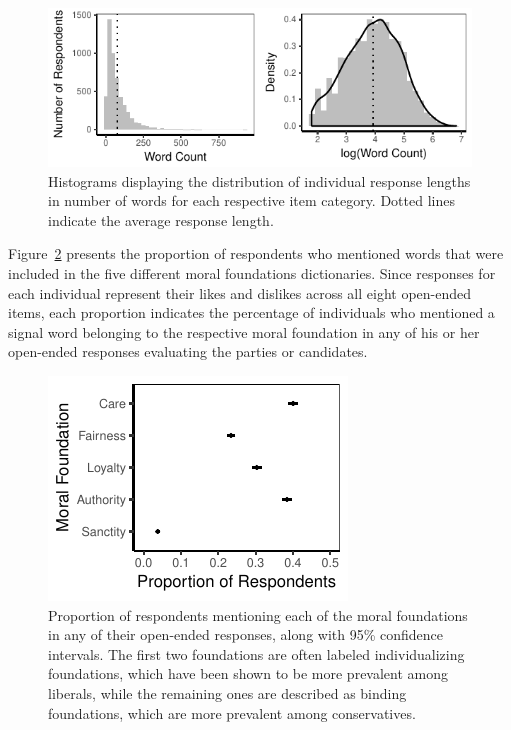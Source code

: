 \documentclass[12pt]{article}
\begin{document}
\begin{figure}[h]\centering
\includegraphics{../calc/fig/app_wc.pdf}
\caption{Histograms displaying the distribution of individual response lengths in number of words for each respective item category. Dotted lines indicate the average response length.}\label{fig:appB2num}
\end{figure}


Figure~\ref{fig:prop_ideol} presents the proportion of respondents who mentioned words that were included in the five different moral foundations dictionaries. Since responses for each individual represent their likes and dislikes across all eight open-ended items, each proportion indicates the percentage of individuals who mentioned a signal word belonging to the respective moral foundation in any of his or her open-ended responses evaluating the parties or candidates.

\begin{figure}[ht]\centering
\includegraphics{../calc/fig/prop_mft.pdf}
\caption{Proportion of respondents mentioning each of the moral foundations in any of their open-ended responses, along with 95\% confidence intervals. The first two foundations are often labeled individualizing foundations, which have been shown to be more prevalent among liberals, while the remaining ones are described as binding foundations, which are more prevalent among conservatives.}\label{fig:prop_ideol}
\end{figure}
\end{document}
